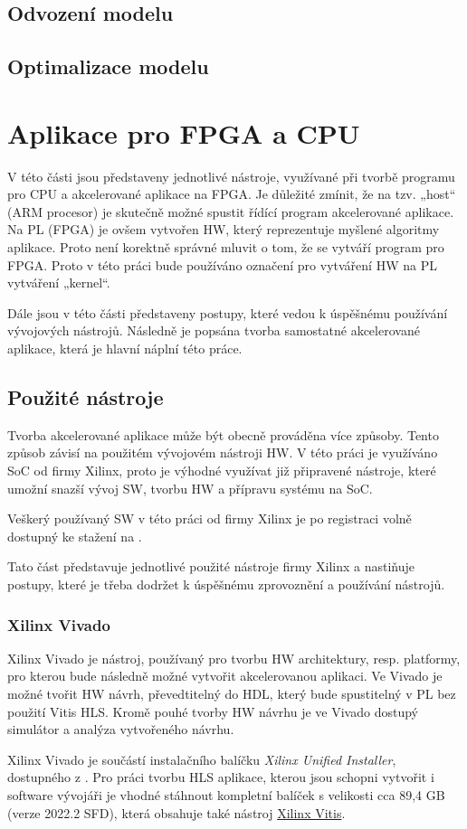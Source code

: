 \documentclass[a4paper, twoside, 11pt]{article}
\begin{document}
	\subsection{Odvození modelu}
	\subsection{Optimalizace modelu}

\section{Aplikace pro FPGA a CPU}
V této části jsou představeny jednotlivé nástroje, využívané při tvorbě programu pro CPU a akcelerované aplikace na FPGA. Je důležité zmínit, že na tzv. „host“ (ARM procesor) je skutečně možné spustit řídící program akcelerované aplikace. Na PL (FPGA) je ovšem vytvořen HW, který reprezentuje myšlené algoritmy aplikace. Proto není korektně správné mluvit o tom, že se vytváří program pro FPGA. Proto v této práci bude používáno označení pro vytváření HW na PL vytváření „kernel“.\par
	Dále jsou v této části představeny postupy, které vedou k úspěšnému používání vývojových nástrojů. Následně je popsána tvorba samostatné akcelerované aplikace, která je hlavní náplní této práce.
	\subsection{Použité nástroje}
		Tvorba akcelerované aplikace může být obecně prováděna více způsoby. Tento způsob závisí na použitém vývojovém nástroji HW. V této práci je využíváno SoC od firmy Xilinx, proto je výhodné využívat již připravené nástroje, které umožní snazší vývoj SW, tvorbu HW a přípravu systému na SoC.\par
		Veškerý používaný SW v této práci od firmy Xilinx je po registraci volně dostupný ke stažení na \cite{xilinx-downloads}.\par
		Tato část představuje jednotlivé použité nástroje firmy Xilinx a nastiňuje postupy, které je třeba dodržet k úspěšnému zprovoznění a používání nástrojů.
		\subsubsection{Xilinx Vivado}\label{subsubsec:xilinx-vivado}
			Xilinx Vivado je nástroj, používaný pro tvorbu HW architektury, resp. platformy, pro kterou bude následně možné vytvořit akcelerovanou aplikaci. Ve Vivado je možné tvořit HW návrh, převedtitelný do HDL, který bude spustitelný v PL bez použití Vitis HLS. Kromě pouhé tvorby HW návrhu je ve Vivado dostupý simulátor a analýza vytvořeného návrhu.\par
			Xilinx Vivado je součástí instalačního balíčku \textit{Xilinx Unified Installer}, dostupného z \cite{xilinx-downloads}. Pro práci tvorbu HLS aplikace, kterou jsou schopni vytvořit i software vývojáři je vhodné stáhnout kompletní balíček s velikosti cca 89,4 GB (verze 2022.2 SFD), která obsahuje také nástroj \hyperref[subsubsec:xilinx-vitis]{Xilinx Vitis}.
\end{document}
